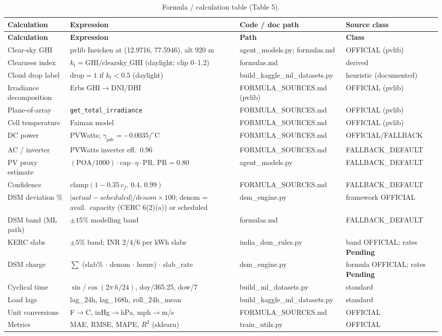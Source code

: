 \documentclass[11pt,a4paper]{article}
\newcommand{\stPend}{\textcolor{cpart}{\textbf{Pending}}}
\newcommand{\code}[1]{\texttt{\small #1}}
\begin{document}
\begin{footnotesize}
\begin{longtable}{@{}p{2.8cm}p{4.3cm}p{2.6cm}p{2.6cm}@{}}
\caption{Formula / calculation table (Table 5).}\label{tab:formula}\\
\toprule
\textbf{Calculation} & \textbf{Expression} & \textbf{Code / doc path} & \textbf{Source class}\\
\midrule\endfirsthead
\toprule \textbf{Calculation} & \textbf{Expression} & \textbf{Path} & \textbf{Class}\\ \midrule\endhead
\bottomrule\endfoot
Clear-sky GHI & pvlib Ineichen at (12.9716, 77.5946), alt 920 m & agent\_models.py; formulas.md & OFFICIAL (pvlib)\\
Clearness index & $k_t = \mathrm{GHI}/\mathrm{clearsky\_GHI}$ (daylight; clip 0--1.2) & formulas.md & derived\\
Cloud drop label & $\mathrm{drop}=1$ if $k_t<0.5$ (daylight) & build\_kaggle\_ml\_datasets.py & heuristic (documented)\\
Irradiance decomposition & Erbs GHI$\to$DNI/DHI & FORMULA\_SOURCES.md (pvlib) & OFFICIAL (pvlib)\\
Plane-of-array & \code{get\_total\_irradiance} & FORMULA\_SOURCES.md & OFFICIAL (pvlib)\\
Cell temperature & Faiman model & FORMULA\_SOURCES.md & OFFICIAL (pvlib)\\
DC power & PVWatts; $\gamma_{pdc}=-0.0035/^\circ$C & FORMULA\_SOURCES.md & OFFICIAL/FALLBACK\\
AC / inverter & PVWatts inverter eff.\ 0.96 & FORMULA\_SOURCES.md & FALLBACK\_DEFAULT\\
PV proxy estimate & $(\mathrm{POA}/1000)\cdot\mathrm{cap}\cdot\eta\cdot\mathrm{PR}$, PR$=0.80$ & agent\_models.py & FALLBACK\_DEFAULT\\
Confidence & $\mathrm{clamp}(1-0.35\,c_f,\,0.4,\,0.99)$ & FORMULA\_SOURCES.md & FALLBACK\_DEFAULT\\
DSM deviation \% & $|actual-scheduled|/denom\times100$; denom = avail.\ capacity (CERC 6(2)(a)) or scheduled & dsm\_engine.py & framework OFFICIAL\\
DSM band (ML path) & $\pm15\%$ modelling band & formulas.md & FALLBACK\_DEFAULT\\
KERC slabs & $\pm5\%$ band; INR 2/4/6 per kWh slabs & india\_dsm\_rules.py & band OFFICIAL; rates \stPend\\
DSM charge & $\sum$ (slab\% $\cdot$ denom $\cdot$ hours) $\cdot$ slab\_rate & dsm\_engine.py & formula OFFICIAL; rates \stPend\\
Cyclical time & $\sin/\cos(2\pi\,h/24)$, doy/365.25, dow/7 & build\_ml\_datasets.py & standard\\
Load lags & lag\_24h, lag\_168h, roll\_24h\_mean & build\_kaggle\_ml\_datasets.py & standard\\
Unit conversions & F$\to$C, inHg$\to$hPa, mph$\to$m/s & FORMULA\_SOURCES.md & OFFICIAL\\
Metrics & MAE, RMSE, MAPE, $R^2$ (sklearn) & train\_utils.py & OFFICIAL\\
\end{longtable}
\end{footnotesize}
\end{document}
